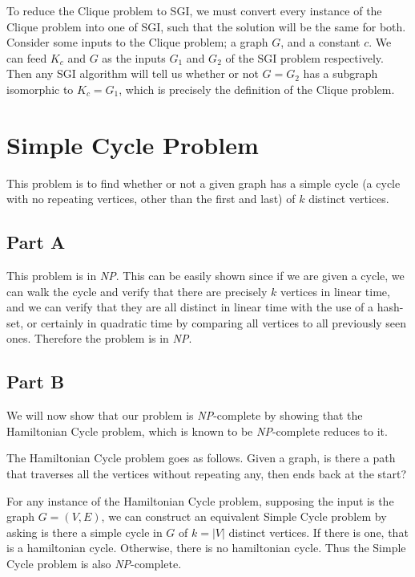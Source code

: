 \documentclass{article}
\begin{document}
To reduce the Clique problem to SGI, we must convert every instance of the Clique problem into one of SGI, such that the solution will be the same for both. Consider some inputs to the Clique problem; a graph \(G\), and a constant \(c\). We can feed \(K_c\) and \(G\) as the inputs \(G_1\) and \(G_2\) of the SGI problem respectively. Then any SGI algorithm will tell us whether or not \(G = G_2\) has a subgraph isomorphic to \(K_c = G_1\), which is precisely the definition of the Clique problem.


\section{Simple Cycle Problem}

This problem is to find whether or not a given graph has a simple cycle (a cycle with no repeating vertices, other than the first and last) of \(k\) distinct vertices.

\subsection*{Part A}

This problem is in \textit{NP}. This can be easily shown since if we are given a cycle, we can walk the cycle and verify that there are precisely \(k\) vertices in linear time, and we can verify that they are all distinct in linear time with the use of a hash-set, or certainly in quadratic time by comparing all vertices to all previously seen ones. Therefore the problem is in \textit{NP}.

\subsection*{Part B}

We will now show that our problem is \textit{NP}-complete by showing that the Hamiltonian Cycle problem, which is known to be \textit{NP}-complete reduces to it.

The Hamiltonian Cycle problem goes as follows. Given a graph, is there a path that traverses all the vertices without repeating any, then ends back at the start?

For any instance of the Hamiltonian Cycle problem, supposing the input is the graph \(G = (V, E)\), we can construct an equivalent Simple Cycle problem by asking is there a simple cycle in \(G\) of \(k = |V|\) distinct vertices. If there is one, that is a hamiltonian cycle. Otherwise, there is no hamiltonian cycle. Thus the Simple Cycle problem is also \textit{NP}-complete.
\end{document}
